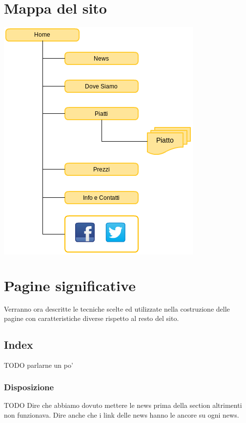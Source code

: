\documentclass[10pt,a4paper,onecolumn]{article}
\begin{document}
\section{Mappa del sito}
\includegraphics[width=.9\textwidth]{mappasito.png}


\clearpage

\section{Pagine significative}

Verranno ora descritte le tecniche scelte ed utilizzate nella costruzione delle pagine con caratteristiche diverse rispetto al resto del sito.

\subsection{Index}

TODO parlarne un po'

\subsubsection{Disposizione}

TODO Dire che abbiamo dovuto mettere le news prima della section altrimenti non funzionava. Dire anche che i link delle news hanno le ancore su ogni news.
\end{document}
